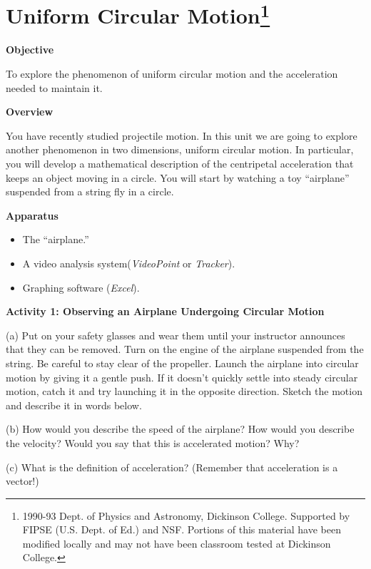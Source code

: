 
\section{Uniform Circular Motion\footnote{
1990-93 Dept. of Physics and Astronomy, Dickinson College. Supported by FIPSE
(U.S. Dept. of Ed.) and NSF. Portions of this material have been modified locally
and may not have been classroom tested at Dickinson College.
}}

\makelabheader %

\textbf{Objective }

To explore the phenomenon of uniform circular motion and the acceleration needed
to maintain it.

\textbf{Overview} 

You have recently studied projectile motion. In this unit we are going to explore
another phenomenon in two dimensions, uniform circular motion. In particular,
you will develop a mathematical description of the centripetal acceleration
that keeps an object moving in a circle. You will start by watching a toy ``airplane''
suspended from a string fly in a circle.

\textbf{Apparatus}

\begin{itemize}
\item The ``airplane.''
\item A video analysis system(\textit{VideoPoint} or \textit{Tracker}). 
\item Graphing software (\textit{Excel}).
\end{itemize}
\textbf{Activity 1: Observing an Airplane Undergoing Circular Motion} 

(a) Put on your safety glasses and wear them until your instructor announces
that they can be removed. Turn on the engine of the airplane suspended from
the string. Be careful to stay clear of the propeller. Launch the airplane into
circular motion by giving it a gentle push. If it doesn't quickly settle into
steady circular motion, catch it and try launching it in the opposite direction.
Sketch the motion and describe it in words below. 
\vspace{30mm}

(b) How would you describe the speed of the airplane? How would you
describe the
velocity? Would you say that this is accelerated motion? Why?
\vspace{20mm}

(c) What is the definition of acceleration? (Remember that acceleration is a
vector!)
\vspace{20mm}

